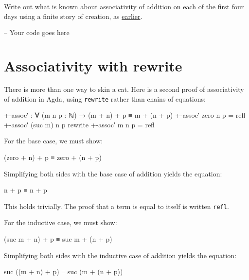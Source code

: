 Write out what is known about associativity of addition on each of the
first four days using a finite story of creation, as
\protect\hyperlink{Naturals-finite-creation}{earlier}.

\begin{fence}
\begin{code}
-- Your code goes here
\end{code}
\end{fence}

\hypertarget{associativity-with-rewrite}{%
\section{Associativity with rewrite}\label{associativity-with-rewrite}}

There is more than one way to skin a cat. Here is a second proof of
associativity of addition in Agda, using \texttt{rewrite} rather than
chains of equations:

\begin{fence}
\begin{code}
+-assoc′ : ∀ (m n p : ℕ) → (m + n) + p ≡ m + (n + p)
+-assoc′ zero    n p                          =  refl
+-assoc′ (suc m) n p  rewrite +-assoc′ m n p  =  refl
\end{code}
\end{fence}

For the base case, we must show:

\begin{myDisplay}
(zero + n) + p ≡ zero + (n + p)
\end{myDisplay}

Simplifying both sides with the base case of addition yields the
equation:

\begin{myDisplay}
n + p ≡ n + p
\end{myDisplay}

This holds trivially. The proof that a term is equal to itself is
written \texttt{refl}.

For the inductive case, we must show:

\begin{myDisplay}
(suc m + n) + p ≡ suc m + (n + p)
\end{myDisplay}

Simplifying both sides with the inductive case of addition yields the
equation:

\begin{myDisplay}
suc ((m + n) + p) ≡ suc (m + (n + p))
\end{myDisplay}

